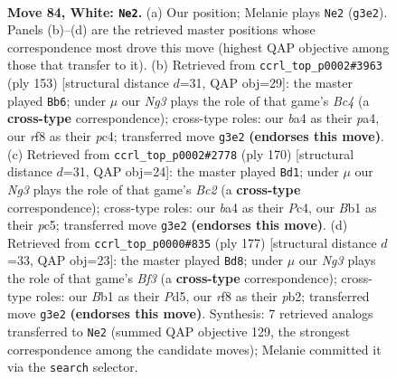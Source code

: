 \documentclass[11pt]{article}
\begin{document}
\clearpage

\begin{figure}[p]\centering
\begin{subfigure}{0.46\textwidth}\centering
\resizebox{\linewidth}{!}{%
\newchessgame
\chessboard[
  setfen={5r2/5p2/n5p1/4P2p/b1k2Pp1/6N1/7P/1B4K1 w - - 26 84},
  showmover=false,
  pgfstyle=straightmove, color=movearrow, markmove={g3-e2}
]}
\caption{}
\end{subfigure}\hfill
\begin{subfigure}{0.46\textwidth}\centering
\resizebox{\linewidth}{!}{%
\newchessgame
\chessboard[
  setfen={B7/8/6k1/p1b2p2/P1P1p1p1/4P1P1/5P2/7K b - - 25 77},
  showmover=false,
  pgfstyle=straightmove, color=movearrow, markmove={c5-b6}
]}
\caption{}
\end{subfigure}
\\[4pt]
\begin{subfigure}{0.46\textwidth}\centering
\resizebox{\linewidth}{!}{%
\newchessgame
\chessboard[
  setfen={8/5k2/6p1/2p1pp1p/2P1p2P/6P1/2B3K1/8 w - - 54 86},
  showmover=false,
  pgfstyle=straightmove, color=movearrow, markmove={c2-d1}
]}
\caption{}
\end{subfigure}\hfill
\begin{subfigure}{0.46\textwidth}\centering
\resizebox{\linewidth}{!}{%
\newchessgame
\chessboard[
  setfen={8/5k2/1p2pb2/p2p3K/3P1P2/P2BP3/1P6/8 b - - 58 89},
  showmover=false,
  pgfstyle=straightmove, color=movearrow, markmove={f6-d8}
]}
\caption{}
\end{subfigure}
\caption{\textbf{Move 84, White: \texttt{Ne2}.} (a) Our position; Melanie plays \texttt{Ne2} (\texttt{g3e2}). Panels (b)--(d) are the retrieved master positions whose correspondence most drove this move (highest QAP objective among those that transfer to it). (b) Retrieved from \texttt{ccrl\_top\_p0002\#3963} (ply 153) [structural distance $d$=31, QAP obj=29]: the master played \texttt{Bb6}; under $\mu$ our \emph{Ng3} plays the role of that game's \emph{Bc4} (a \textbf{cross-type} correspondence); cross-type roles: our \emph{b}a4 as their \emph{p}a4, our \emph{r}f8 as their \emph{p}c4; transferred move \texttt{g3e2} \textbf{(endorses this move)}. (c) Retrieved from \texttt{ccrl\_top\_p0002\#2778} (ply 170) [structural distance $d$=31, QAP obj=24]: the master played \texttt{Bd1}; under $\mu$ our \emph{Ng3} plays the role of that game's \emph{Bc2} (a \textbf{cross-type} correspondence); cross-type roles: our \emph{b}a4 as their \emph{P}c4, our \emph{B}b1 as their \emph{p}c5; transferred move \texttt{g3e2} \textbf{(endorses this move)}. (d) Retrieved from \texttt{ccrl\_top\_p0000\#835} (ply 177) [structural distance $d$=33, QAP obj=23]: the master played \texttt{Bd8}; under $\mu$ our \emph{Ng3} plays the role of that game's \emph{Bf3} (a \textbf{cross-type} correspondence); cross-type roles: our \emph{B}b1 as their \emph{P}d5, our \emph{r}f8 as their \emph{p}b2; transferred move \texttt{g3e2} \textbf{(endorses this move)}. Synthesis: 7 retrieved analogs transferred to \texttt{Ne2} (summed QAP objective 129, the strongest correspondence among the candidate moves); Melanie committed it via the \texttt{search} selector.}
\label{fig:thought-m166}
\end{figure}
\end{document}
